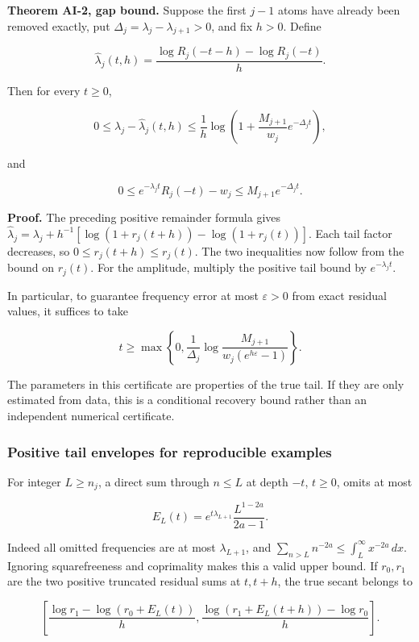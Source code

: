 \textbf{Theorem AI-2, gap bound.} Suppose the first \(j-1\) atoms have
already been removed exactly, put
\(\Delta_j=\lambda_j-\lambda_{j+1}>0\), and fix \(h>0\). Define

\[
 \widehat\lambda_j(t,h)
 =\frac{\log R_j(-t-h)-\log R_j(-t)}h.
\]

Then for every \(t\ge0\),

\[
 0\le\lambda_j-\widehat\lambda_j(t,h)
 \le\frac1h\log\!\left(1+\frac{M_{j+1}}{w_j}e^{-\Delta_jt}\right),
\]

and

\[
 0\le e^{-\lambda_jt}R_j(-t)-w_j
     \le M_{j+1}e^{-\Delta_jt}.
\]

\textbf{Proof.} The preceding positive remainder formula gives
\(\widehat\lambda_j=\lambda_j+h^{-1}[\log(1+r_j(t+h))-\log(1+r_j(t))]\).
Each tail factor decreases, so \(0\le r_j(t+h)\le r_j(t)\). The two
inequalities now follow from the bound on \(r_j(t)\). For the amplitude,
multiply the positive tail bound by \(e^{-\lambda_jt}\).

In particular, to guarantee frequency error at most \(\varepsilon>0\)
from exact residual values, it suffices to take

\[
 t\ge\max\left\{0,\frac1{\Delta_j}
      \log\frac{M_{j+1}}{w_j(e^{h\varepsilon}-1)}\right\}.
\]

The parameters in this certificate are properties of the true tail. If
they are only estimated from data, this is a conditional recovery bound
rather than an independent numerical certificate.

\hypertarget{positive-tail-envelopes-for-reproducible-examples}{%
\subsubsection{Positive tail envelopes for reproducible
examples}\label{positive-tail-envelopes-for-reproducible-examples}}

For integer \(L\ge n_j\), a direct sum through \(n\le L\) at depth
\(-t\), \(t\ge0\), omits at most

\[
 E_L(t)=e^{t\lambda_{L+1}}\frac{L^{1-2a}}{2a-1}.
\]

Indeed all omitted frequencies are at most \(\lambda_{L+1}\), and
\(\sum_{n>L}n^{-2a}\le\int_L^\infty x^{-2a}\,dx\). Ignoring
squarefreeness and coprimality makes this a valid upper bound. If
\(r_0,r_1\) are the two positive truncated residual sums at \(t,t+h\),
the true secant belongs to

\[
 \left[
 \frac{\log r_1-\log(r_0+E_L(t))}h,
 \frac{\log(r_1+E_L(t+h))-\log r_0}h
 \right].
\]


